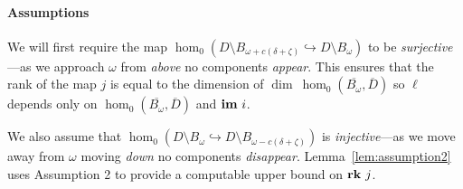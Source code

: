 \paragraph*{Assumptions}

We will first require the map $\hom_0(D\setminus B_{\omega+c(\delta+\zeta)}\hookrightarrow D\setminus B_\omega)$ to be \emph{surjective}---as we approach $\omega$ from \emph{above} no components \emph{appear}.
This ensures that the rank of the map $j$ is equal to the dimension of $\dim~\hom_0(\overline{B_\omega}, \overline{D})$ so $\ell$ depends only on $\hom_0(\overline{B_\omega}, \overline{D})$ and $\mathbf{im}~i$.

We also assume that $\hom_0(D\setminus B_\omega\hookrightarrow D\setminus B_{\omega-c(\delta+\zeta)})$ is \emph{injective}---as we move away from $\omega$ moving \emph{down} no components \emph{disappear}.
Lemma~\ref{lem:assumption2} uses Assumption 2 to provide a computable upper bound on $\mathbf{rk}~j$.%

